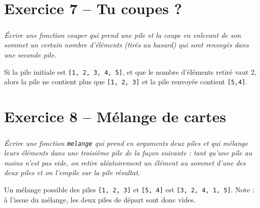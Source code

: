 \documentclass[10pt,fleqn]{article} %
\begin{document}
\begin{multicols}{2}
\section*{Exercice 7 -- Tu coupes ?}
\setcounter{exo}{0}
\subparagraph*{}
\textit{Écrire une fonction couper qui prend une pile et la coupe en enlevant de son sommet un
certain nombre d’éléments (tirés au hasard) qui sont renvoyés dans une seconde pile.}

\begin{exemple}
Si la pile initiale est \texttt{[1, 2, 3, 4, 5]}, et que le nombre d’éléments retiré vaut 2, alors la pile ne contient plus que \texttt{[1, 2, 3]} et la pile renvoyée contient \texttt{[5,4]}.
\end{exemple}
\ifprof
\begin{corrige}
\end{corrige}
\else
\fi

\section*{Exercice 8 -- Mélange de cartes}
\setcounter{exo}{0}
\subparagraph*{}
\textit{Écrire une fonction \texttt{melange} qui prend en arguments deux piles et qui
mélange leurs éléments dans une troisième pile de la façon suivante : tant qu’une pile au moins n’est pas vide, on retire aléatoirement un élément au sommet d’une des deux piles et on l’empile sur la pile résultat. }
\begin{exemple}
Un mélange possible des piles \texttt{[1, 2, 3]} et \texttt{[5, 4]} est \texttt{[3, 2, 4, 1, 5]}. Note : à l’issue du mélange, les deux piles de départ sont donc vides.
\end{exemple}

\ifprof
\begin{corrige}
\end{corrige}
\else
\fi
%
\end{multicols}
\end{document}
